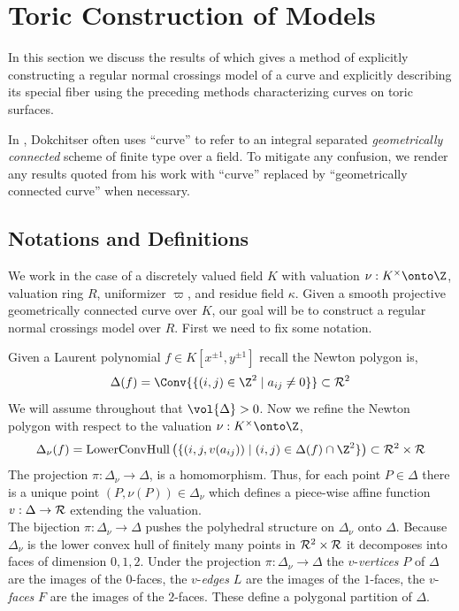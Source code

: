 
\section{Toric Construction of Models}

In this section we discuss the results of \cite{tim} which gives a method of explicitly constructing a regular normal crossings model of a curve and explicitly describing its special fiber using the preceding methods characterizing curves on toric surfaces. 
\begin{rmk}
In \cite{tim}, Dokchitser often uses ``curve'' to refer to an integral separated \textit{geometrically connected} scheme of finite type over a field. To mitigate any confusion, we render any results quoted from his work with ``curve'' replaced by ``geometrically connected curve'' when necessary.
\end{rmk}

\subsection{Notations and Definitions}

We work in the case of a discretely valued field $K$ with valuation $\nu : K^\times \onto \Z$, valuation ring $R$, uniformizer $\varpi$, and residue field $\kappa$. Given a smooth projective geometrically connected curve over $K$, our goal will be to construct a regular normal crossings model over $R$. First we need to fix some notation.

\begin{defn}
Given a Laurent polynomial $f \in K[x^{\pm 1}, y^{\pm 1}]$ recall the Newton polygon is,
\[ \Delta(f) = \Conv{ \{ (i,j) \in \Z^2 \mid a_{ij} \neq 0 \} } \subset \R^2 \]
We will assume throughout that $\vol{\Delta} > 0$. 
Now we refine the Newton polygon with respect to the valuation $\nu : K^\times \onto \Z$,
\[ \Delta_\nu(f) = \mathrm{LowerConvHull} \left( \{ (i, j, v(a_{ij})) \mid (i, j) \in \Delta(f) \cap \Z^2 \} \right) \subset \R^2 \times \R \]
The projection $\pi : \Delta_\nu \to \Delta$, is a homomorphism. Thus,
for each point $P \in \Delta$ there is a unique point $(P, \nu(P)) \in \Delta_\nu$ which defines a piece-wise affine function $v : \Delta \to \mathcal{R}$ extending the valuation. 
\bigskip\\
The bijection $\pi : \Delta_\nu \to \Delta$ pushes the polyhedral structure on $\Delta_\nu$ onto $\Delta$. Because $\Delta_\nu$ is the lower convex hull of finitely many points in $\mathcal{R}^2 \times \mathcal{R}$ it decomposes into faces of dimension $0, 1, 2$. Under the projection $\pi : \Delta_\nu \to \Delta$ the $v$-\textit{vertices} $P$ of $\Delta$ are the images of the $0$-faces, the $v$-\textit{edges} $L$ are the images of the $1$-faces, the $v$-\textit{faces} $F$ are the images of the $2$-faces. These define a polygonal partition of $\Delta$. 
\end{defn}

